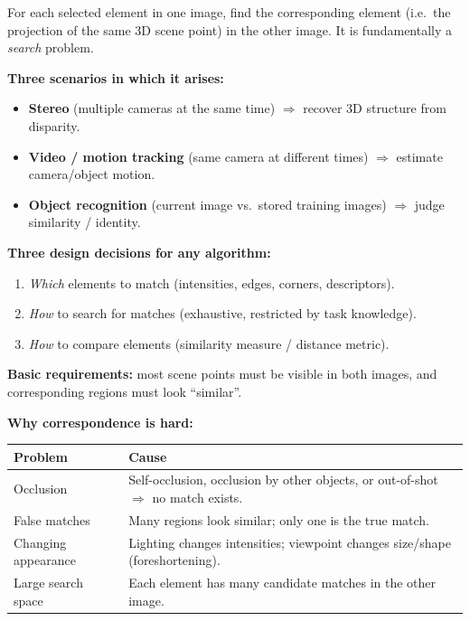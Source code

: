 \begin{defbox}
For each selected element in one image, find the corresponding element (i.e.\ the projection of the same 3D scene point) in the other image. It is fundamentally a \emph{search} problem.
\end{defbox}

\textbf{Three scenarios in which it arises:}
\begin{itemize}
  \item \textbf{Stereo} (multiple cameras at the same time) $\Rightarrow$ recover 3D structure from disparity.
  \item \textbf{Video / motion tracking} (same camera at different times) $\Rightarrow$ estimate camera/object motion.
  \item \textbf{Object recognition} (current image vs.\ stored training images) $\Rightarrow$ judge similarity / identity.
\end{itemize}

\textbf{Three design decisions for any algorithm:}
\begin{enumerate}
  \item \emph{Which} elements to match (intensities, edges, corners, descriptors).
  \item \emph{How} to search for matches (exhaustive, restricted by task knowledge).
  \item \emph{How} to compare elements (similarity measure / distance metric).
\end{enumerate}

\textbf{Basic requirements:} most scene points must be visible in both images, and corresponding regions must look ``similar''.

\separator

\textbf{Why correspondence is hard:}
\begin{center}
\renewcommand{\arraystretch}{1.3}
\begin{tabular}{@{} l p{9cm} @{}}
\toprule
\textbf{Problem} & \textbf{Cause} \\
\midrule
Occlusion & Self-occlusion, occlusion by other objects, or out-of-shot $\Rightarrow$ no match exists. \\
False matches & Many regions look similar; only one is the true match. \\
Changing appearance & Lighting changes intensities; viewpoint changes size/shape (foreshortening). \\
Large search space & Each element has many candidate matches in the other image. \\
\bottomrule
\end{tabular}
\end{center}

